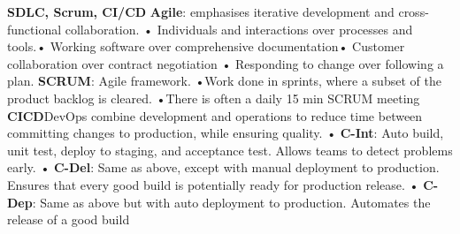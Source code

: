 \documentclass[10pt, landscape]{article}
\begin{document}
\begin{multicols}{4}
\textbf{SDLC, Scrum, CI/CD}
\textbf{Agile}: emphasises iterative development and cross-functional collaboration.
• Individuals and interactions over processes and tools.• Working software over comprehensive documentation• Customer collaboration over contract negotiation • Responding to change over following a plan.
\textbf{SCRUM}: Agile framework. •Work done in sprints, where a subset of the product backlog
is cleared. •There is often a daily 15 min SCRUM meeting
\textbf{CICD}DevOps combine development and operations to reduce time between committing changes to production, while ensuring quality.
• \textbf{C-Int}: Auto build, unit test, deploy to staging, and acceptance test. Allows teams to detect problems early.
• \textbf{C-Del}: Same as above, except with manual deployment to production. Ensures that every good build is potentially ready for production release.
• \textbf{C-Dep}: Same as above but with auto deployment to production. Automates the release of a good build\newline


\end{multicols}
\end{document}
